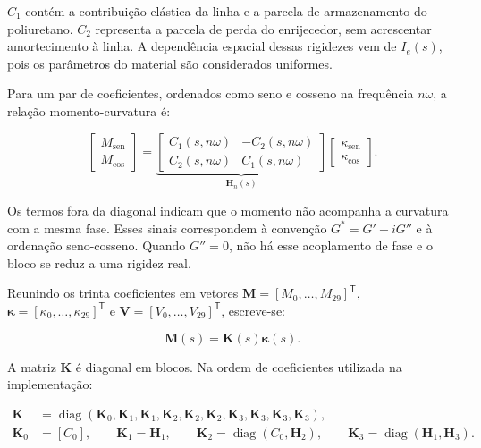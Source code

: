 \documentclass[arial,centeredequations,english,brazilian,oneside,section=TITLE]{ifes8}
\begin{document}
$C_1$ contém a contribuição elástica da linha e a parcela de armazenamento do
poliuretano. $C_2$ representa a parcela de perda do enrijecedor, sem acrescentar
amortecimento à linha. A dependência espacial dessas rigidezes vem de $I_e(s)$,
pois os parâmetros do material são considerados uniformes.

Para um par de coeficientes, ordenados como seno e cosseno na frequência
$n\omega$, a relação momento-curvatura é:

\begin{equation}
  \begin{bmatrix}M_{\mathrm{sen}}\\ M_{\mathrm{cos}}\end{bmatrix}
  =\underbrace{\begin{bmatrix}
    C_1(s,n\omega)&-C_2(s,n\omega)\\
    C_2(s,n\omega)& C_1(s,n\omega)
  \end{bmatrix}}_{\mathbf H_n(s)}
  \begin{bmatrix}\kappa_{\mathrm{sen}}\\ \kappa_{\mathrm{cos}}\end{bmatrix}.
  \label{eq:bloco-rigidez-harmonico}
\end{equation}

Os termos fora da diagonal indicam que o momento não acompanha a curvatura
com a mesma fase. Esses sinais correspondem à convenção
$G^*=G'+iG''$ e à ordenação seno-cosseno. Quando $G''=0$, não há esse
acoplamento de fase e o bloco se reduz a uma rigidez real.

Reunindo os trinta coeficientes em vetores
$\boldsymbol M=[M_0,\ldots,M_{29}]^{\mathsf T}$,
$\boldsymbol\kappa=[\kappa_0,\ldots,\kappa_{29}]^{\mathsf T}$ e
$\boldsymbol V=[V_0,\ldots,V_{29}]^{\mathsf T}$, escreve-se:

\begin{equation}
  \boldsymbol M(s)=\mathbf K(s)\boldsymbol\kappa(s).
  \label{eq:momento-curvatura-vetorial-linear}
\end{equation}

A matriz $\mathbf K$ é diagonal em blocos. Na ordem de coeficientes utilizada
na implementação:

\begin{align}
  \mathbf K&=\operatorname{diag}
    (\mathbf K_0,\mathbf K_1,\mathbf K_1,
     \mathbf K_2,\mathbf K_2,\mathbf K_2,
     \mathbf K_3,\mathbf K_3,\mathbf K_3,\mathbf K_3),
    \label{eq:matriz-rigidez-global-linear}\\
  \mathbf K_0&=[C_0],\qquad
  \mathbf K_1=\mathbf H_1,\qquad
  \mathbf K_2=\operatorname{diag}(C_0,\mathbf H_2),\qquad
  \mathbf K_3=\operatorname{diag}(\mathbf H_1,\mathbf H_3).
    \label{eq:blocos-por-ordem-linear}
\end{align}
\end{document}
